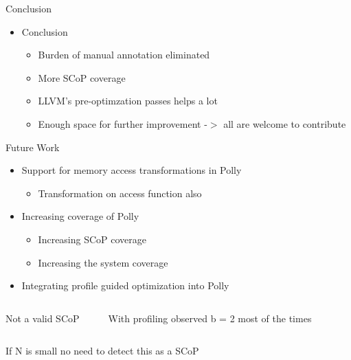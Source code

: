 \documentclass{beamer}
\begin{document}
\begin{frame}{Conclusion}
\begin{itemize}
\item Conclusion
	\begin{itemize}
	\item Burden of manual annotation eliminated
	\item More SCoP coverage
	\item LLVM's pre-optimzation passes helps a lot
	\item Enough space for further improvement -$>$ all are welcome to contribute
	\end{itemize}
\end{itemize}
\end{frame}
\begin{frame}[shrink]{Future Work}
\begin{itemize}
\item Support for memory access transformations in Polly {\color{red}{(Planned for GSOC 2011)}}
	\begin{itemize}
	\item Transformation on access function also
	\end{itemize}
\item Increasing coverage of Polly
	\begin{itemize}
	\item Increasing SCoP coverage
	\item Increasing the system coverage
	\end{itemize}
\item Integrating profile guided optimization into Polly
\end{itemize}
	\begin{columns}[t]
 {	
		\begin{block}{Not a valid SCoP}
	{\tiny}
		\end{block}
}

 {	
}
 {	
		\begin{block}{With profiling observed b = 2 most of the times}
	{\tiny}
		\end{block}
}
	\end{columns}

 {	
\begin{block}{If N is small no need to detect this as a SCoP}
{\tiny}
\end{block}
}

\end{frame}
\end{document}
